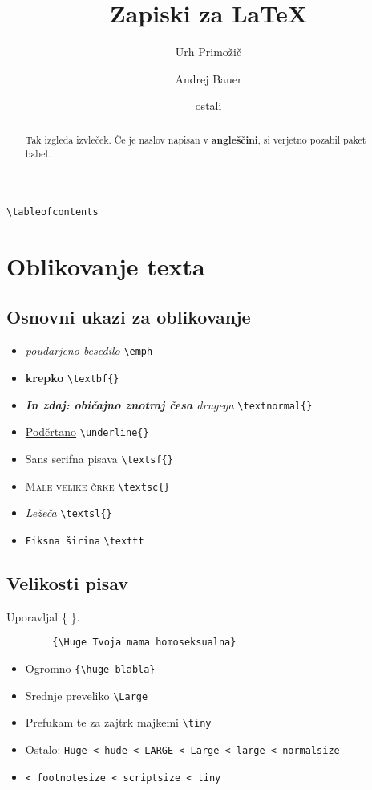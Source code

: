\documentclass[a4paper, 12pt]{article}
\title{Zapiski za {\LaTeX}} %
\author{Urh Primožič \and Andrej Bauer \and ostali} %
\newcommand{\tx}{\hspace*{0pt}\hfill\verb}
\begin{document}
    \maketitle
    \begin{abstract}
        Tak izgleda izvleček. Če je naslov napisan v \textbf{angleščini}, si verjetno pozabil paket babel.
    \end{abstract}

    \tx|\tableofcontents|
    \tableofcontents

    \newpage

    \section{Oblikovanje texta}
    \subsection{Osnovni ukazi za oblikovanje}
        \begin{itemize}
            \item \emph{poudarjeno besedilo} \tx|\emph|
            \item \textbf{krepko} \tx|\textbf{}|
            \item \emph{\textbf{In zdaj: \textnormal{običajno} znotraj česa } drugega} \tx|\textnormal{}| %
            \item \underline{Podčrtano} \tx|\underline{}| 
            \item \textsf{Sans serifna pisava} \tx|\textsf{}|
            \item \textsc{Male velike črke} \tx|\textsc{}|
            \item \textsl{Ležeča} \tx|\textsl{}|
            \item \texttt{Fiksna širina} \tx|\texttt|
        \end{itemize}
    \subsection{Velikosti pisav}
    Uporavljal \{ \}. 
    \begin{verbatim}
        {\Huge Tvoja mama homoseksualna}
    \end{verbatim}
    \begin{itemize}
        \item {\Huge Ogromno}  \tx|{\huge blabla}|
        \item {\Large Srednje preveliko} \tx|\Large|
        \item {\tiny Prefukam te za zajtrk majkemi} \tx|\tiny|
        \item Ostalo: \verb|Huge < hude < LARGE < Large < large < normalsize| 
        \item \verb|< footnotesize < scriptsize < tiny| 
    \end{itemize}
\end{document}
